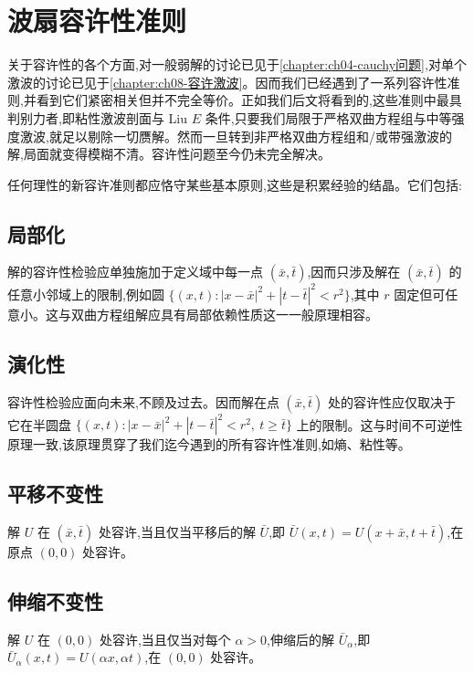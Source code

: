 \documentclass[../../main.tex]{subfiles}
\begin{document}
\section{波扇容许性准则}\label{section:ch09-波扇容许性准则}

关于容许性的各个方面,对一般弱解的讨论已见于\cref{chapter:ch04-cauchy问题},对单个激波的讨论已见于\cref{chapter:ch08-容许激波}。因而我们已经遇到了一系列容许性准则,并看到它们紧密相关但并不完全等价。正如我们后文将看到的,这些准则中最具判别力者,即粘性激波剖面与 Liu $E$ 条件,只要我们局限于严格双曲方程组与中等强度激波,就足以剔除一切赝解。然而一旦转到非严格双曲方程组和/或带强激波的解,局面就变得模糊不清。容许性问题至今仍未完全解决。

任何理性的新容许准则都应恪守某些基本原则,这些是积累经验的结晶。它们包括:

\subsection{局部化}\label{subsection:ch09-局部化}
解的容许性检验应单独施加于定义域中每一点 $(\bar{x},\bar{t})$,因而只涉及解在 $(\bar{x},\bar{t})$ 的任意小邻域上的限制,例如圆 $\{(x,t):|x-\bar{x}|^{2}+|t-\bar{t}|^{2}<r^{2}\}$,其中 $r$ 固定但可任意小。这与双曲方程组解应具有局部依赖性质这一一般原理相容。

\subsection{演化性}\label{subsection:ch09-演化性}
容许性检验应面向未来,不顾及过去。因而解在点 $(\bar{x},\bar{t})$ 处的容许性应仅取决于它在半圆盘 $\{(x,t):|x-\bar{x}|^{2}+|t-\bar{t}|^{2}<r^{2},\ t\geqslant\bar{t}\}$ 上的限制。这与时间不可逆性原理一致,该原理贯穿了我们迄今遇到的所有容许性准则,如熵、粘性等。

\subsection{平移不变性}\label{subsection:ch09-平移不变性}
解 $U$ 在 $(\bar{x},\bar{t})$ 处容许,当且仅当平移后的解 $\bar{U}$,即 $\bar{U}(x,t)=U(x+\bar{x},t+\bar{t})$,在原点 $(0,0)$ 处容许。

\subsection{伸缩不变性}\label{subsection:ch09-伸缩不变性}
解 $U$ 在 $(0,0)$ 处容许,当且仅当对每个 $\alpha>0$,伸缩后的解 $\bar{U}_{\alpha}$,即 $\bar{U}_{\alpha}(x,t)=U(\alpha x,\alpha t)$,在 $(0,0)$ 处容许。
\end{document}
